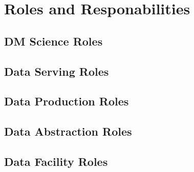 \section{Roles and Responabilities} \label{sec:roles}



\subsection{DM Science  Roles}


\subsection{Data Serving Roles}



\subsection{Data Production Roles}





\subsection{Data Abstraction Roles}



\subsection{Data Facility Roles}







